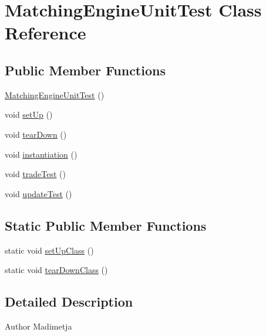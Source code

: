 \hypertarget{class_matching_engine_unit_test}{\section{Matching\+Engine\+Unit\+Test Class Reference}
\label{class_matching_engine_unit_test}
}
\subsection*{Public Member Functions}
\begin{DoxyCompactItemize}
\item 
\hyperlink{class_matching_engine_unit_test_ac0212366a59b035f17ecece829dd8237}{Matching\+Engine\+Unit\+Test} ()
\item 
void \hyperlink{class_matching_engine_unit_test_a2fe9413d67e2ad0c8233d11d1f209548}{set\+Up} ()
\item 
void \hyperlink{class_matching_engine_unit_test_adececd49e895e978d85a27b8470104d3}{tear\+Down} ()
\item 
void \hyperlink{class_matching_engine_unit_test_acbb8d543a15e349d8f46769388fd28bd}{instantiation} ()
\item 
void \hyperlink{class_matching_engine_unit_test_a2dbbdf5632bac8d35d6902caf5556c5f}{trade\+Test} ()
\item 
void \hyperlink{class_matching_engine_unit_test_a914f15f54087d84798e02b33734a9791}{update\+Test} ()
\end{DoxyCompactItemize}
\subsection*{Static Public Member Functions}
\begin{DoxyCompactItemize}
\item 
static void \hyperlink{class_matching_engine_unit_test_a35f673f5cdf8f8282686a1f84ee2dd37}{set\+Up\+Class} ()
\item 
static void \hyperlink{class_matching_engine_unit_test_a0fb23de300ffd3a7d2b42e84d457be09}{tear\+Down\+Class} ()
\end{DoxyCompactItemize}


\subsection{Detailed Description}
\begin{DoxyAuthor}{Author}
Madimetja 
\end{DoxyAuthor}


